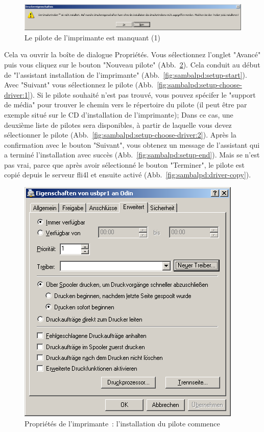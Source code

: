 \begin{figure}[hbt!]
\centering
\includegraphics[width=\columnwidth]{image008}
\caption{Le pilote de l'imprimante est manquant (1)}
\label{fig:sambalpd:no-driver:1}
\end{figure}

Cela va ouvrir la boîte de dialogue Propriétés. Vous sélectionnez l'onglet
"Avancé" puis vous cliquez sur le bouton "Nouveau pilote"
(Abb.~\ref{fig:sambalpd:props-start-setup}). Cela conduit au début de
"l'assistant installation de l'imprimante" (Abb.~\ref{fig:sambalpd:setup-start}).
Avec "Suivant" vous sélectionnez le pilote (Abb.~\ref{fig:sambalpd:setup-choose-driver:1}).
Si le pilote souhaité n'est pas trouvé, vous pouvez spécifer le "support
de média" pour trouver le chemin vers le répertoire du pilote (il peut
être par exemple situé sur le CD d'installation de l'imprimante); Dans ce cas,
une deuxième liste de pilotes sera disponibles, à partir de laquelle vous
devez sélectionner le pilote (Abb.~\ref{fig:sambalpd:setup-choose-driver:2}).
Après la confirmation avec le bouton "Suivant", vous obtenez un message de 
l'assistant qui a terminé l'installation avec succès (Abb.~\ref{fig:sambalpd:setup-end}).
Mais se n'est pas vrai, parce que après avoir sélectionné le bouton "Terminer",
le pilote est copié depuis le serveur fli4l et ensuite activé
(Abb.~\ref{fig:sambalpd:driver-copy}).

\begin{figure}[hbt!]
\centering
\includegraphics[width=0.8\columnwidth]{image009}
\caption{Propriétés de l'imprimante~: l'installation du pilote commence}
\label{fig:sambalpd:props-start-setup}
\end{figure}

